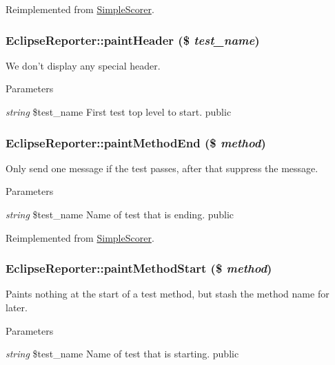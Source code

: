 Reimplemented from \hyperlink{class_simple_scorer_a738721074c609d1ced9010b57cd0779c}{SimpleScorer}.\hypertarget{class_eclipse_reporter_a050de6302927aea46cae03b72b6d1c0b}{
\subsubsection[{paintHeader}]{\setlength{\rightskip}{0pt plus 5cm}EclipseReporter::paintHeader (\$ {\em test\_\-name})}}
\label{class_eclipse_reporter_a050de6302927aea46cae03b72b6d1c0b}
We don't display any special header. 
\begin{DoxyParams}{Parameters}
\item[{\em string}]\$test\_\-name First test top level to start.  public \end{DoxyParams}
\hypertarget{class_eclipse_reporter_a1322beebd54bfec26b6453b4e7a23d68}{
\subsubsection[{paintMethodEnd}]{\setlength{\rightskip}{0pt plus 5cm}EclipseReporter::paintMethodEnd (\$ {\em method})}}
\label{class_eclipse_reporter_a1322beebd54bfec26b6453b4e7a23d68}
Only send one message if the test passes, after that suppress the message. 
\begin{DoxyParams}{Parameters}
\item[{\em string}]\$test\_\-name Name of test that is ending.  public \end{DoxyParams}


Reimplemented from \hyperlink{class_simple_scorer_a419382f8670b1d944f2036bb02dc2800}{SimpleScorer}.\hypertarget{class_eclipse_reporter_a3beefc3a53542af1e4eb1dbca13a69fb}{
\subsubsection[{paintMethodStart}]{\setlength{\rightskip}{0pt plus 5cm}EclipseReporter::paintMethodStart (\$ {\em method})}}
\label{class_eclipse_reporter_a3beefc3a53542af1e4eb1dbca13a69fb}
Paints nothing at the start of a test method, but stash the method name for later. 
\begin{DoxyParams}{Parameters}
\item[{\em string}]\$test\_\-name Name of test that is starting.  public \end{DoxyParams}


